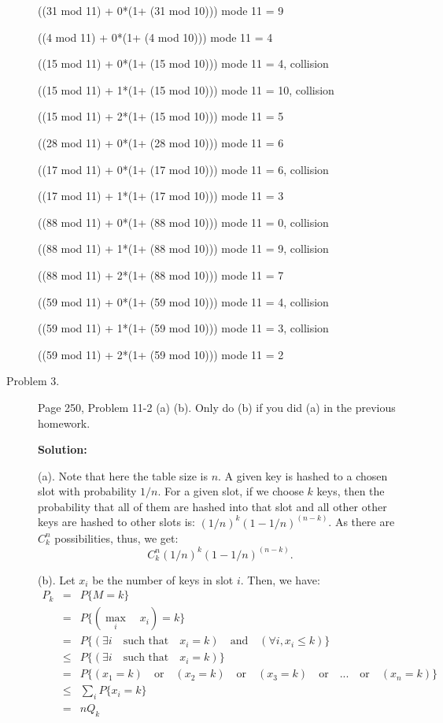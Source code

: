 \documentclass[11pt]{article}
\begin{document}
\begin{description}
((31 mod 11) + 0*(1+ (31 mod 10))) mode 11 = 9

((4 mod 11) + 0*(1+ (4 mod 10))) mode 11 = 4

((15 mod 11) + 0*(1+ (15 mod 10))) mode 11 = 4, collision

((15 mod 11) + 1*(1+ (15 mod 10))) mode 11 = 10, collision

((15 mod 11) + 2*(1+ (15 mod 10))) mode 11 = 5

((28 mod 11) + 0*(1+ (28 mod 10))) mode 11 = 6

((17 mod 11) + 0*(1+ (17 mod 10))) mode 11 = 6, collision

((17 mod 11) + 1*(1+ (17 mod 10))) mode 11 = 3

((88 mod 11) + 0*(1+ (88 mod 10))) mode 11 = 0, collision

((88 mod 11) + 1*(1+ (88 mod 10))) mode 11 = 9, collision

((88 mod 11) + 2*(1+ (88 mod 10))) mode 11 = 7

((59 mod 11) + 0*(1+ (59 mod 10))) mode 11 = 4, collision

((59 mod 11) + 1*(1+ (59 mod 10))) mode 11 = 3, collision

((59 mod 11) + 2*(1+ (59 mod 10))) mode 11 = 2






\item[Problem 3.]
Page 250, Problem 11-2 (a) (b). Only do (b) if you did (a) in the previous
homework.

\noindent \textbf{Solution:}

(a). Note that here the table size is $n$. A given key is hashed to a chosen
slot with probability $1/n$. For a given slot, if we choose $k$ keys, then the
probability that all of them are hashed into that slot and all other other keys
are hashed to other slots is: $(1/n)^k(1-1/n)^{(n-k)}$. As there are
$C^{n}_{k}$ possibilities, thus, we get:
$$
C^{n}_{k} (1/n)^k(1-1/n)^{(n-k)}.
$$


(b). Let $x_i$ be the number of keys in slot $i$. Then, we have:
\begin{eqnarray}
P_k &=& P\{M=k\} \\
&=& P\{(\max_i \quad x_i)=k\} \\
&=& P\{(\exists i \quad \mbox{such that}\quad x_i=k) \quad \mbox{and} \quad
(\forall i, x_i \le k)\} \\
&\le& P\{(\exists i \quad \mbox{such that}\quad x_i=k)\} \\
&=& P\{ (x_1=k) \quad \mbox{or} \quad (x_2=k) \quad \mbox{or} \quad (x_3=k)
\quad \mbox{or} \quad ... \quad \mbox{or} \quad  (x_n=k) \} \\
&\le& \sum_{i} P\{ x_i=k \} \\
&=& nQ_k
\end{eqnarray}



\end{description}
\end{document}
